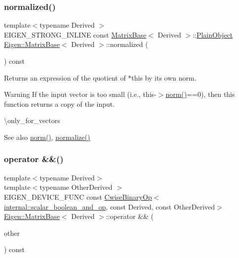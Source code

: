 \subsubsection{\texorpdfstring{normalized()}{normalized()}}
{\footnotesize\ttfamily template$<$typename Derived $>$ \\
E\+I\+G\+E\+N\+\_\+\+S\+T\+R\+O\+N\+G\+\_\+\+I\+N\+L\+I\+NE const \mbox{\hyperlink{class_eigen_1_1_matrix_base}{Matrix\+Base}}$<$ Derived $>$\+::\mbox{\hyperlink{class_eigen_1_1_dense_base_aae45af9b5aca5a9caae98fd201f47cc4}{Plain\+Object}} \mbox{\hyperlink{class_eigen_1_1_matrix_base}{Eigen\+::\+Matrix\+Base}}$<$ Derived $>$\+::normalized (\begin{DoxyParamCaption}{ }\end{DoxyParamCaption}) const}

\begin{DoxyReturn}{Returns}
an expression of the quotient of {\ttfamily $\ast$this} by its own norm.
\end{DoxyReturn}
\begin{DoxyWarning}{Warning}
If the input vector is too small (i.\+e., this-\/$>$\mbox{\hyperlink{class_eigen_1_1_matrix_base_a5f6a3bc46add1f2e879ce15040e6987e}{norm()}}==0), then this function returns a copy of the input.
\end{DoxyWarning}
\textbackslash{}only\+\_\+for\+\_\+vectors

\begin{DoxySeeAlso}{See also}
\mbox{\hyperlink{class_eigen_1_1_matrix_base_a5f6a3bc46add1f2e879ce15040e6987e}{norm()}}, \mbox{\hyperlink{class_eigen_1_1_matrix_base_a1a2dd2fd1597ee6d51098aa3bb7c86f4}{normalize()}} 
\end{DoxySeeAlso}
\mbox{\label{class_eigen_1_1_matrix_base_ac627838c5639468b08f77733c88acdcb}} 
\subsubsection{\texorpdfstring{operator \&\&()}{operator \&\&()}}
{\footnotesize\ttfamily template$<$typename Derived$>$ \\
template$<$typename Other\+Derived $>$ \\
E\+I\+G\+E\+N\+\_\+\+D\+E\+V\+I\+C\+E\+\_\+\+F\+U\+NC const \mbox{\hyperlink{class_eigen_1_1_cwise_binary_op}{Cwise\+Binary\+Op}}$<$\mbox{\hyperlink{struct_eigen_1_1internal_1_1scalar__boolean__and__op}{internal\+::scalar\+\_\+boolean\+\_\+and\+\_\+op}}, const Derived, const Other\+Derived$>$ \mbox{\hyperlink{class_eigen_1_1_matrix_base}{Eigen\+::\+Matrix\+Base}}$<$ Derived $>$\+::operator \&\& (\begin{DoxyParamCaption}\item[{const E\+I\+G\+E\+N\+\_\+\+C\+U\+R\+R\+E\+N\+T\+\_\+\+S\+T\+O\+R\+A\+G\+E\+\_\+\+B\+A\+S\+E\+\_\+\+C\+L\+A\+SS$<$ Other\+Derived $>$ \&}]{other }\end{DoxyParamCaption}) const\hspace{0.3cm}{\ttfamily [inline]}}

